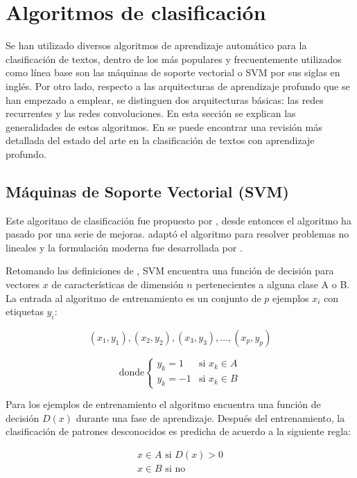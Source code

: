 \section{Algoritmos de clasificación}
Se han utilizado diversos algoritmos de aprendizaje automático para la clasificación de textos, dentro de los más populares y frecuentemente utilizados como línea base son las máquinas de soporte vectorial o SVM por sus siglas en inglés. Por otro lado, respecto a las arquitecturas de aprendizaje profundo que se han empezado a emplear, se distinguen dos arquitecturas básicas: las redes recurrentes y las redes convoluciones. En esta sección se explican las generalidades de estos algoritmos. En \citep{Minaee2020} se puede encontrar una revisión más detallada del estado del arte en la clasificación de textos con aprendizaje profundo.


\subsection{Máquinas de Soporte Vectorial (SVM)}
Este algoritmo de clasificación fue propuesto por \citep{vapnik1964class}, desde entonces el algoritmo ha pasado por una serie de mejoras. \citep{boser1992training} adaptó el algoritmo para resolver problemas no lineales  y la formulación moderna fue desarrollada por \citep{cortes1995support}.

Retomando las definiciones de \citep{boser1992training}, SVM encuentra una función de decisión para vectores $x$ de características de dimensión $n$ pertenecientes a alguna clase A o B. La entrada al algoritmo de entrenamiento es un conjunto de $p$ ejemplos $x_i$ con etiquetas $y_i$:

\begin{equation} \label{eq:training}
(x_1, y_1), (x_2, y_2), (x_3, y_3), ... , (x_p, y_p) 
\end{equation}

\[
    \text{donde}
    \begin{cases}
        y_k=1 & \text{si $x_k \in A$}\\
        y_k=-1 & \text{si $x_k \in B$}
    \end{cases}
\]

Para los ejemplos de entrenamiento el algoritmo encuentra una función de decisión $D(x)$ durante una fase de aprendizaje. Después del entrenamiento, la clasificación de patrones desconocidos es predicha de acuerdo a la siguiente regla:

\begin{equation} \label{eq:svm_de}
\begin{split}
    x \in A \text{ si } D(x)>0 \\
    x \in B \text{ si no } 
\end{split}
\end{equation}

